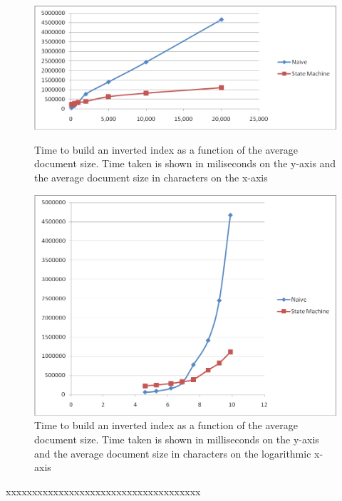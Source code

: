 \documentclass[10pt]{article}
\begin{document}
\begin{figure}[ht]
  \begin{minipage}[b]{0.5\linewidth}
    \centering
    \includegraphics[width=\textwidth]{naivedocumentsize}
    \caption{Time to build an inverted index as a function of the
      average document size. Time taken is shown in miliseconds on the
      y-axis and the average document size in characters on the x-axis}
    \label{fig:naivedocumentsize}
  \end{minipage}
  \hspace{0.5cm}
  \begin{minipage}[b]{0.5\linewidth}
    \centering
    \includegraphics[width=\textwidth]{naivedocumentsizelog}
    \caption{Time to build an inverted index as a function of the
      average document size. Time taken is shown in milliseconds on the
      y-axis and the average document size in characters on the
      logarithmic x-axis}
    \label{fig:naivedocumentsizelog}
  \end{minipage}
\end{figure}


xxxxxxxxxxxxxxxxxxxxxxxxxxxxxxxxxxxxx
\end{document}
